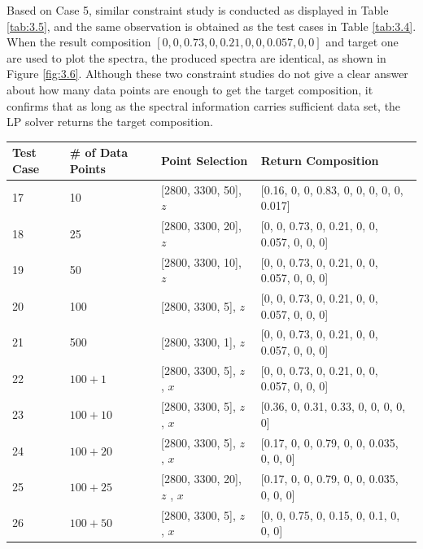 Based on Case 5, similar constraint study is conducted as displayed in Table \ref{tab:3.5}, and the same observation is obtained as the test cases in Table \ref{tab:3.4}. When the result composition $[0, 0, 0.73, 0, 0.21,0, 0, 0.057, 0, 0]$ and target one are used to plot the spectra, the produced spectra are identical, as shown in Figure \ref{fig:3.6}. Although these two constraint studies do not give a clear answer about how many data points are enough to get the target composition, it confirms that as long as the spectral information carries sufficient data set, the LP solver returns the target composition.
\begin{table}[ht!] \small 
\begin{center} 
{\def\arraystretch{1.5}
\begin{tabular}{| p{1cm} | p{2cm} | p{4cm}  | l |} 
\hline
Test Case & \# of Data Points & Point Selection & Return Composition \\ \hline
17 & 10 & [2800, 3300, 50], $z$ & [0.16, 0, 0, 0.83, 0, 0, 0, 0, 0, 0.017] \\ \hline
18 & 25 & [2800, 3300, 20], $z$ & [0, 0, 0.73, 0, 0.21, 0, 0, 0.057, 0, 0, 0] \\ \hline
19 & 50 & [2800, 3300, 10], $z$ & [0, 0, 0.73, 0, 0.21, 0, 0, 0.057, 0, 0, 0] \\ \hline
20 & 100 & [2800, 3300, 5], $z$ & [0, 0, 0.73, 0, 0.21, 0, 0, 0.057, 0, 0, 0] \\ \hline
21 & 500 & [2800, 3300, 1], $z$ & [0, 0, 0.73, 0, 0.21, 0, 0, 0.057, 0, 0, 0] \\ \hline	
22 & $100 + 1$ & [2800, 3300, 5], $z$ \newline [2800, 3300, 500], $x$  & [0, 0, 0.73, 0, 0.21, 0, 0, 0.057, 0, 0, 0] \\ \hline
23 & $100 + 10$ & [2800, 3300, 5], $z$ \newline [2800, 3300, 50], $x$  & [0.36, 0, 0.31, 0.33, 0, 0, 0, 0, 0] \\ \hline
24 & $100 + 20$ & [2800, 3300, 5], $z$ \newline [2800, 3300, 25], $x$  & [0.17, 0, 0, 0.79, 0, 0, 0.035, 0, 0, 0] \\ \hline
25 & $100 + 25$ & [2800, 3300, 20], $z$ \newline [2800, 3300, 20], $x$  & [0.17, 0, 0, 0.79, 0, 0, 0.035, 0, 0, 0] \\ \hline
26 & $100 + 50$ & [2800, 3300, 5], $z$ \newline [2800, 3300, 10], $x$  & [0, 0, 0.75, 0, 0.15, 0, 0.1, 0, 0, 0] \\ \hline

\end{tabular}}
\end{center}
\end{table}
